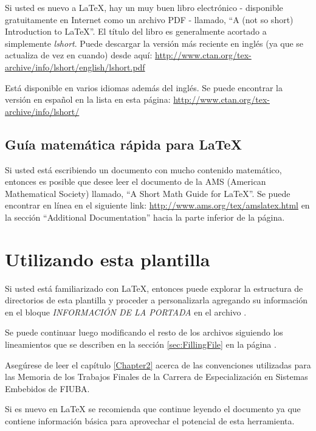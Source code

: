 Si usted es nuevo a \LaTeX{}, hay un muy buen libro electrónico - disponible gratuitamente en Internet como un archivo PDF - llamado, \enquote{A (not so short) Introduction to \LaTeX{}}. El título del libro es generalmente acortado a simplemente \emph{lshort}. Puede descargar la versión más reciente en inglés (ya que se actualiza de vez en cuando) desde aquí:
\url{http://www.ctan.org/tex-archive/info/lshort/english/lshort.pdf}

Está disponible en varios idiomas además del inglés. Se puede encontrar la versión en español en la lista en esta página: \url{http://www.ctan.org/tex-archive/info/lshort/}


\subsection{Guía matemática rápida para \LaTeX{}}

Si usted está escribiendo un documento con mucho contenido matemático, entonces es posible que desee leer el documento de la AMS (American Mathematical Society) llamado, \enquote{A Short Math Guide for \LaTeX{}}. Se puede encontrar en línea en el siguiente link: \url{http://www.ams.org/tex/amslatex.html} en la sección \enquote{Additional Documentation} hacia la parte inferior de la página.



\section{Utilizando esta plantilla}

Si usted está familiarizado con \LaTeX{}, entonces puede explorar la estructura de directorios de esta plantilla y proceder a personalizarla agregando su información en el bloque \emph{INFORMACIÓN DE LA PORTADA} en el archivo .  

Se puede continuar luego modificando el resto de los archivos siguiendo los lineamientos que se describen en la sección \ref{sec:FillingFile} en la página \pageref{sec:FillingFile}.

Asegúrese de leer el capítulo \ref{Chapter2} acerca de las convenciones utilizadas para las Memoria de los Trabajos Finales de la Carrera de Especialización en Sistemas Embebidos de FIUBA.

Si es nuevo en \LaTeX{} se recomienda que continue leyendo el documento ya que contiene información básica para aprovechar el potencial de esta herramienta.


